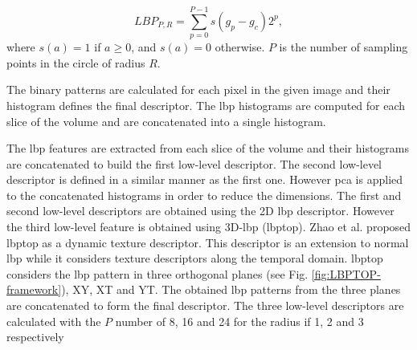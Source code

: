 \begin{equation} \label{Eq:LBP}
LBP_{P,R} = \sum_{p=0}^{P-1}s(g_{p} - g_{c})2^{p},
\end{equation}
where $s(a) = 1$ if $a \geq 0$, and $s(a)=0$ otherwise. $P$ is the number of sampling points in the circle of radius $R$.

The binary patterns are calculated for each pixel in the given image and their histogram defines the final descriptor.
The \ac{lbp} histograms are computed for each slice of the volume and are concatenated into a single histogram.




The \ac{lbp} features are extracted from each slice of the volume and their histograms are concatenated to build the first low-level descriptor. The second low-level descriptor is defined in a similar manner as the first one. However \ac{pca} is applied to the concatenated histograms in order to reduce the dimensions. The first and second low-level descriptors are obtained using the 2D \ac{lbp} descriptor. However the third low-level feature is obtained using 3D-\ac{lbp} (\ac{lbptop}). Zhao et al. \cite{zhao2007dynamic} proposed \ac{lbptop} as a dynamic texture descriptor. This descriptor is an extension to normal \ac{lbp} while it considers texture descriptors along the temporal domain. \ac{lbptop} considers the \ac{lbp} pattern in three orthogonal planes (see Fig. \ref{fig:LBPTOP-framework}), XY, XT and YT. The obtained \ac{lbp} patterns from the three planes are concatenated to form the final descriptor. The three low-level descriptors are calculated with the $P$ number of 8, 16 and 24 for the radius if 1, 2 and 3 respectively

